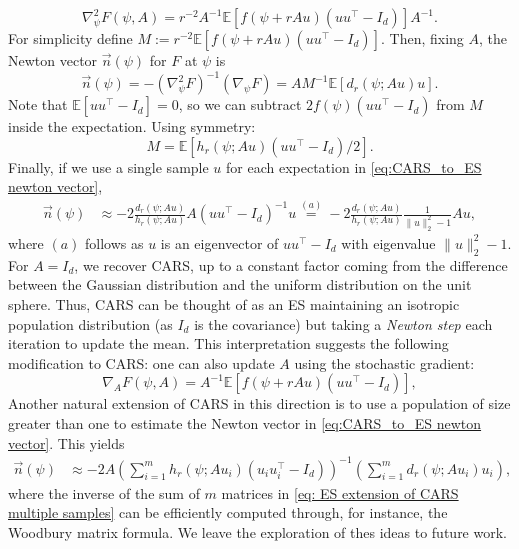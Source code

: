 \begin{equation} \label{eq:CARS_to_ES hessian wrt psi}
    \nabla_{\psi}^2 F(\psi,A) = r^{-2} A^{-1}\mathbb{E}[f(\psi+r A u) (u u^{\top} - I_d)]A^{-1}.
\end{equation}
For simplicity define $M := r^{-2}\mathbb{E}[f(\psi + r A u)(u u^{\top}-I_d)]$.
Then, fixing $A$, the Newton vector $\vec{n}(\psi)$ for $F$ at $\psi$ is
\begin{equation}\label{eq:CARS_to_ES newton vector}
    \vec{n}(\psi) =    -(\nabla_{\psi}^2 F)^{-1}(\nabla_{\psi} F)
    = A M^{-1} \mathbb{E}[d_r(\psi; Au)u].
\end{equation}
Note that $\mathbb{E}[u u^{\top} - I_d] = 0$, so we can subtract $2f(\psi)(u u^{\top} - I_d)$ from $M$ inside the expectation. Using symmetry:
\begin{equation*}
    M = \mathbb{E}[h_r(\psi; Au)(u u^{\top}-I_d)/2].
\end{equation*}
Finally, if we use a single sample $u$ for each expectation in \eqref{eq:CARS_to_ES newton vector},
\begin{align*}
    \vec{n}(\psi) & \approx -2\frac{d_r (\psi;Au)}{h_r (\psi;Au)} A(u u^{\top}-I_d)^{-1}u \stackrel{(a)}{=} - 2\frac{d_r (\psi;Au)}{h_r (\psi;Au)} \frac{1}{\|u\|_2^2 - 1}Au,
\end{align*}
where $(a)$ follows as $u$ is an eigenvector of $u u^{\top} - I_d$ with eigenvalue $\|u\|_2^2 - 1$.
For $A=I_d$, we recover CARS, up to a constant factor
coming from the difference between the Gaussian distribution and the uniform distribution on the unit sphere. Thus, CARS can be thought of as an ES maintaining an isotropic population distribution (as $I_d$ is the covariance) but taking a {\em Newton step} each iteration to update the mean. This interpretation suggests the following modification to CARS: one can also update $A$ using the stochastic gradient:
\begin{equation*}
    \nabla_{A}F(\psi,A) = 
    A^{-1}\mathbb{E}[f(\psi+r A u) (u u^{\top} - I_d)],
\end{equation*}
Another natural extension of CARS in this direction is to use a population of size greater than one to estimate the Newton vector in \eqref{eq:CARS_to_ES newton vector}. This yields
\begin{align}\label{eq: ES extension of CARS multiple samples}
    \vec{n}(\psi) & \approx -2 A \left(\sum_{i=1}^{m} h_r (\psi; Au_i)(u_i u_i^{\top} - I_d)\right)^{-1} \left(\sum_{i=1}^{m} d_r (\psi; A u_i)u_i \right),
\end{align}
where the inverse of the sum of $m$ matrices in \eqref{eq: ES extension of CARS multiple samples} can be efficiently computed through, for instance, the Woodbury matrix formula.
We leave the exploration of thes ideas to future work.

